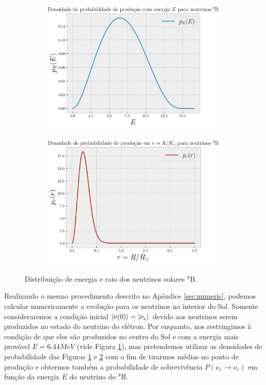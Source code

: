 \documentclass[12pt]{report}
\begin{document}
\begin{figure}[H]
\centering
\begin{subfigure}{.5\textwidth}
  \centering
  \includegraphics[width=.9\linewidth]{fig/nu8b-energy.png}
  \caption{}
  \label{fig:nu8b-energy}
\end{subfigure}%
\begin{subfigure}{.5\textwidth}
  \centering
  \includegraphics[width=.9\linewidth]{fig/nu8b-raio.png}
  \caption{}
  \label{fig:nu8b-raio}
\end{subfigure}
\caption{Distribuição de energia e raio dos neutrinos solares $^8\text{B}$.}
\label{fig:nu8b}
\end{figure}

Realizando o mesmo procedimento descrito no Apêndice \ref{sec:numeric}, podemos calcular numericamente a evolução para os neutrinos no interior do Sol. Somente consideraremos a condição inicial $\ket{\nu(0)} = \ket{\nu_e}$ devido aos neutrinos serem produzidos no estado do neutrino do elétron. Por enquanto, nos restringimos à condição de que eles são produzidos no centro do Sol e com a energia mais provável $E = 6.44 \unit{MeV}$ (vide Figura \ref{fig:nu8b-energy}), mas pretendemos utilizar as densidades de probabilidade das Figuras \ref{fig:nu8b-energy} e \ref{fig:nu8b-raio} com o fim de tirarmos médias no ponto de produção e obtermos também a probabilidade de sobrevivência $P(\nu_e \to \nu_e)$ em função da energia $E$ do neutrino do $^8$B.
\end{document}
